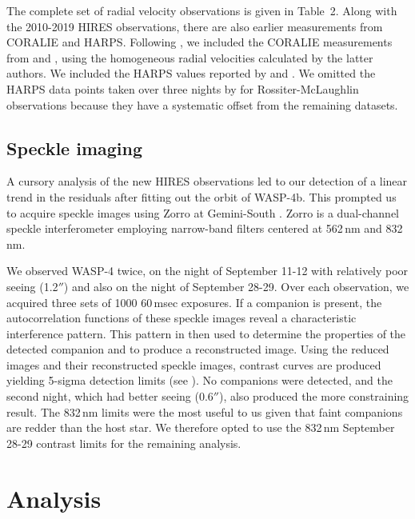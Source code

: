 \documentclass[12pt,twocolumn,tighten]{aastex62}
\begin{document}
The complete set of radial velocity observations is given in Table~2.
Along with the 2010-2019 HIRES observations, there are also earlier
measurements from CORALIE and HARPS.  Following
, we included the CORALIE measurements
from \citet{wilson_wasp-4b_2008} and \citet{triaud_spin-orbit_2010},
using the homogeneous radial velocities calculated by the latter
authors. We included the HARPS values reported by
\citet{pont_determining_2011} and \citet{husnoo_observational_2012}.
We omitted the HARPS data points taken over three nights by
\citet{triaud_spin-orbit_2010} for Rossiter-McLaughlin observations
because they have a systematic offset from the remaining datasets.

\subsection{Speckle imaging}

A cursory analysis of the new HIRES observations led to our detection
of a linear trend in the residuals after fitting out the orbit of
WASP-4b.  This prompted us to acquire speckle images using Zorro at
Gemini-South \citep[see][and the instrument
web-pages\footnote{\url{www.gemini.edu/sciops/instruments/alopeke-zorro/}}]{scott_nessi_2018}.
Zorro is a dual-channel speckle interferometer employing narrow-band
filters centered at 562$\,$nm and 832$\,$nm.  

We observed WASP-4 twice, on the night of September 11-12 with
relatively poor seeing (1.2$''$) and also on the night of September
28-29.  Over each observation, we acquired three sets of 1000
60$\,$msec exposures.  If a companion is present, the autocorrelation
functions of these speckle images reveal a characteristic
interference pattern. This pattern in then used to determine the
properties of the detected companion and to produce a reconstructed
image.  Using the reduced images and their
reconstructed speckle images,  contrast curves are produced yielding
5-sigma detection limits  (see \citealt{howell_speckle_2011}). 
No companions were detected,
and the second night, which had better seeing
(0.6$''$), also produced the more constraining result.  The 832$\,$nm
limits were the most useful to us given that faint companions
are redder than the host star.  We therefore opted to use the
832$\,$nm September 28-29 contrast limits for the remaining analysis.


\section{Analysis}
\label{sec:analysis}
\end{document}
